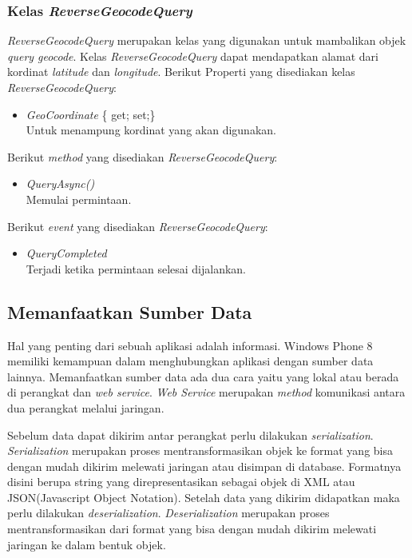 \subsubsection{Kelas \textit{ReverseGeocodeQuery}}
\label{subsubsec:Kelas ReverseGeocodeQuery}
\hspace{0.5cm} \textit{ReverseGeocodeQuery} merupakan kelas yang digunakan untuk mambalikan objek \textit{query geocode}. Kelas \textit{ReverseGeocodeQuery} dapat mendapatkan alamat dari kordinat \textit{latitude} dan \textit{longitude}.
Berikut Properti yang disediakan kelas \textit{ReverseGeocodeQuery}:
\begin{itemize}
	\item \textit{GeoCoordinate} \{ get; set;\} \\
	Untuk menampung kordinat yang akan digunakan.
\end{itemize}

Berikut \textit{method} yang disediakan \textit{ReverseGeocodeQuery}:
\begin{itemize}
	\item \textit{QueryAsync()} \\
		Memulai permintaan.
\end{itemize}

Berikut \textit{event} yang disediakan \textit{ReverseGeocodeQuery}:
\begin{itemize}
	\item \textit{QueryCompleted} \\
		Terjadi ketika permintaan selesai dijalankan.
\end{itemize}

\subsection{Memanfaatkan Sumber Data}
\label{subsec:Memanfaatkan Sumber Data}
\hspace{0.5cm} Hal yang penting dari sebuah aplikasi adalah informasi. Windows Phone 8 memiliki kemampuan dalam menghubungkan aplikasi dengan sumber data lainnya. Memanfaatkan sumber data ada dua cara yaitu yang lokal atau berada di perangkat dan \textit{web service}. \textit{Web Service} merupakan \textit{method} komunikasi antara dua perangkat melalui jaringan. 

Sebelum data dapat dikirim antar perangkat perlu dilakukan \textit{serialization}. \textit{Serialization} merupakan proses mentransformasikan objek ke format yang bisa dengan mudah dikirim melewati jaringan atau disimpan di database\cite{Manning}. Formatnya disini berupa string yang direpresentasikan sebagai objek di XML atau JSON(Javascript Object Notation). Setelah data yang dikirim didapatkan maka perlu dilakukan \textit{deserialization}. \textit{Deserialization} merupakan proses mentransformasikan dari format yang bisa dengan mudah dikirim melewati jaringan ke dalam bentuk objek. 

